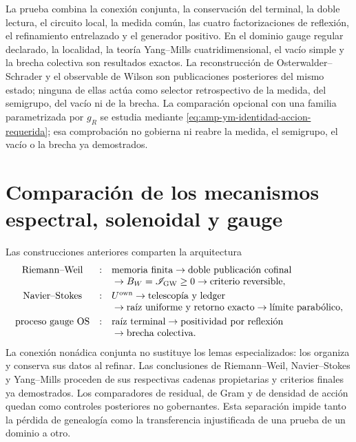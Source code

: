 La prueba combina la conexión conjunta, la conservación del terminal, la
doble lectura, el circuito local, la medida común, las cuatro factorizaciones
de reflexión, el refinamiento entrelazado y el generador positivo. En el
dominio gauge regular declarado, la
localidad, la teoría Yang--Mills cuatridimensional, el vacío simple y la
brecha colectiva son resultados exactos. La reconstrucción de
Osterwalder--Schrader y el observable de Wilson son
publicaciones posteriores del mismo estado; ninguna de ellas actúa como
selector retrospectivo de la medida, del semigrupo, del vacío ni de la
brecha. La comparación opcional con una familia parametrizada por \(g_R\) se estudia
mediante \eqref{eq:amp-ym-identidad-accion-requerida}; esa comprobación no
gobierna ni reabre la medida, el semigrupo, el vacío o la brecha ya
demostrados.

\section*{Comparación de los mecanismos espectral, solenoidal y gauge}

Las construcciones anteriores comparten la arquitectura
\begin{equation}\label{eq:realizaciones-sintesis-tres}
 \begin{array}{ccl}
 \text{Riemann--Weil}
&:& \text{memoria finita}\to\text{doble publicación cofinal}\\
&&{}\to B_W=\mathscr I_{\rm GW}\geq0
      \to\text{criterio reversible},\\[1mm]
 \text{Navier--Stokes}
&:& U^{\rm own}\to\text{telescopía y ledger}\\
&&{}\to\text{raíz uniforme y retorno exacto}
      \to\text{límite parabólico},\\[1mm]
 \text{proceso gauge OS}
&:& \text{raíz terminal}\to\text{positividad por reflexión}\\
&&{}
      \to\text{brecha colectiva}.
 \end{array}
\end{equation}
La conexión nonádica conjunta no sustituye los lemas especializados: los
organiza y conserva sus datos al refinar. Las conclusiones de
Riemann--Weil, Navier--Stokes y Yang--Mills proceden de sus respectivas
cadenas propietarias y criterios finales ya demostrados. Los comparadores
de residual, de Gram y de densidad de acción quedan como controles
posteriores no gobernantes. Esta separación impide tanto la pérdida de
genealogía como la transferencia injustificada de una prueba de un dominio
a otro.


